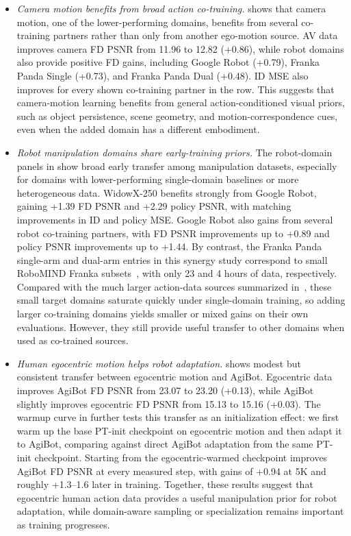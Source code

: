 \documentclass{llmxive}
\begin{document}
\begin{itemize}[leftmargin=*]
    \item \textit{Camera motion benefits from broad action co-training.}
     shows that camera motion, one of the lower-performing domains, benefits from several co-training partners rather than only from another ego-motion source.
    AV data improves camera FD PSNR from 11.96 to 12.82 (+0.86), while robot domains also provide positive FD gains, including Google Robot (+0.79), Franka Panda Single (+0.73), and Franka Panda Dual (+0.48).
    ID MSE also improves for every shown co-training partner in the row.
    This suggests that camera-motion learning benefits from general action-conditioned visual priors, such as object persistence, scene geometry, and motion-correspondence cues, even when the added domain has a different embodiment.

    \item \textit{Robot manipulation domains share early-training priors.}
    The robot-domain panels in  show broad early transfer among manipulation datasets, especially for domains with lower-performing single-domain baselines or more heterogeneous data.
    WidowX-250 benefits strongly from Google Robot, gaining +1.39 FD PSNR and +2.29 policy PSNR, with matching improvements in ID and policy MSE.
    Google Robot also gains from several robot co-training partners, with FD PSNR improvements up to +0.89 and policy PSNR improvements up to +1.44.
    By contrast, the Franka Panda single-arm and dual-arm entries in this synergy study correspond to small RoboMIND Franka subsets~\citep{wu2024robomind}, with only 23 and 4 hours of data, respectively. Compared with the much larger action-data sources summarized in~, these small target domains saturate quickly under single-domain training, so adding larger co-training domains yields smaller or mixed gains on their own evaluations. However, they still provide useful transfer to other domains when used as co-trained sources.

    \item \textit{Human egocentric motion helps robot adaptation.}
     shows modest but consistent transfer between egocentric motion and AgiBot.
    Egocentric data improves AgiBot FD PSNR from 23.07 to 23.20 (+0.13), while AgiBot slightly improves egocentric FD PSNR from 15.13 to 15.16 (+0.03).
    The warmup curve in  further tests this transfer as an initialization effect: we first warm up the base PT-init checkpoint on egocentric motion and then adapt it to AgiBot, comparing against direct AgiBot adaptation from the same PT-init checkpoint.
    Starting from the egocentric-warmed checkpoint improves AgiBot FD PSNR at every measured step, with gains of +0.94 at 5K and roughly +1.3--1.6 later in training.
    Together, these results suggest that egocentric human action data provides a useful manipulation prior for robot adaptation, while domain-aware sampling or specialization remains important as training progresses.
\end{itemize}
\end{document}
